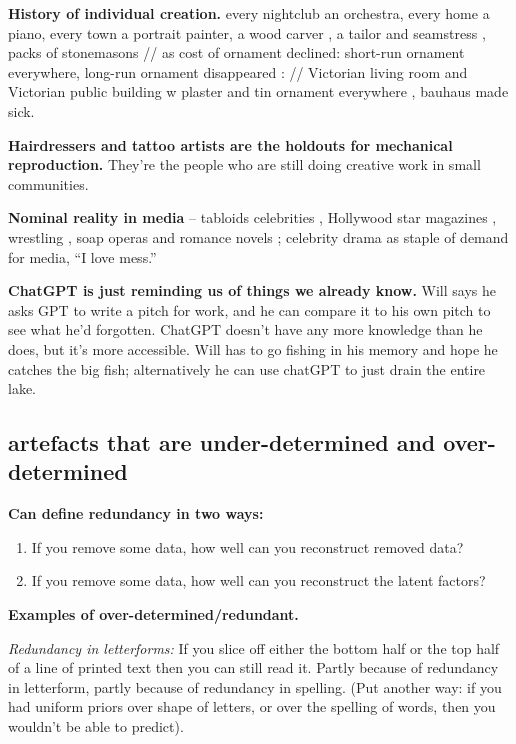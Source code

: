 \documentclass[
  11pt,
  letterpaper,
  DIV=11,
  numbers=noendperiod,
  oneside]{scrartcl}
\providecommand{\tightlist}{%
  \setlength{\itemsep}{0pt}\setlength{\parskip}{0pt}}\usepackage{longtable,booktabs,array}
\begin{document}
\textbf{History of individual creation.} every nightclub an orchestra,
every home a piano, every town a portrait painter, a wood carver , a
tailor and seamstress , packs of stonemasons // as cost of ornament
declined: short-run ornament everywhere, long-run ornament disappeared :
// Victorian living room and Victorian public building w plaster and tin
ornament everywhere , bauhaus made sick.

\textbf{Hairdressers and tattoo artists are the holdouts for mechanical
reproduction.} They're the people who are still doing creative work in
small communities.

\textbf{Nominal reality in media} -- tabloids celebrities , Hollywood
star magazines , wrestling , soap operas and romance novels ; celebrity
drama as staple of demand for media, ``I love mess.''

\textbf{ChatGPT is just reminding us of things we already know.} Will
says he asks GPT to write a pitch for work, and he can compare it to his
own pitch to see what he'd forgotten. ChatGPT doesn't have any more
knowledge than he does, but it's more accessible. Will has to go fishing
in his memory and hope he catches the big fish; alternatively he can use
chatGPT to just drain the entire lake.

\hypertarget{artefacts-that-are-under-determined-and-over-determined}{%
\subsection{artefacts that are under-determined and
over-determined}\label{artefacts-that-are-under-determined-and-over-determined}}

\textbf{Can define redundancy in two ways:}

\begin{enumerate}
\def\labelenumi{\arabic{enumi}.}
\tightlist
\item
  If you remove some data, how well can you reconstruct removed data?
\item
  If you remove some data, how well can you reconstruct the latent
  factors?
\end{enumerate}

\textbf{Examples of over-determined/redundant.}

\emph{Redundancy in letterforms:} If you slice off either the bottom
half or the top half of a line of printed text then you can still read
it. Partly because of redundancy in letterform, partly because of
redundancy in spelling. (Put another way: if you had uniform priors over
shape of letters, or over the spelling of words, then you wouldn't be
able to predict).
\end{document}
